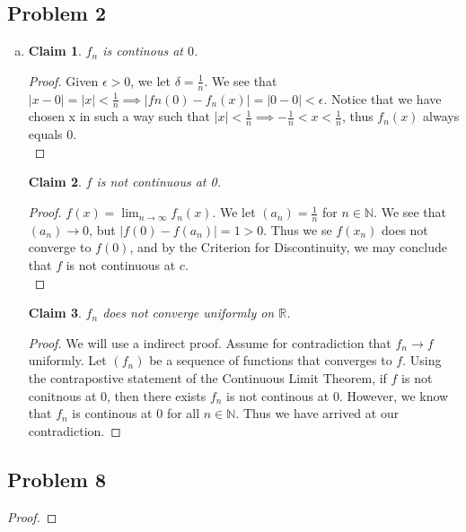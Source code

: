 \documentclass[12pt]{article}
\newtheorem*{claim}{Claim}
\begin{document}
\subsection*{Problem 2}
\begin{enumerate}[a).]
    \item {
        \begin{claim}
            $f_n$ is continous at $0$. 
        \end{claim}
        \begin{proof}
            Given $\epsilon > 0$, we let $\delta = \frac{1}{n}$. We see that $|x-0| = |x| < \frac{1}{n} \implies |fn(0) - f_n(x)| = |0 - 0| < \epsilon$. 
            Notice that we have chosen x in such a way such that $|x| < \frac{1}{n} \implies -\frac{1}{n} < x < \frac{1}{n}$, thus $f_n(x)$ always equals 0. \\
        \end{proof} 

        \begin{claim}
            $f$ is not continuous at 0.
        \end{claim}
        \begin{proof}
            $f(x) = \lim_{n \rightarrow \infty}f_n(x)$. We let $(a_n) = \frac{1}{n}$ for $n \in \mathbb{N}$. 
            We see that $(a_n) \rightarrow 0$, but $|f(0) - f(a_n)| = 1 > 0$.
            Thus we se $f(x_n)$ does not converge to $f(0)$, and by the Criterion for Discontinuity, we may conclude that $f$ is not continuous at $c$. \\
        \end{proof}

        \begin{claim}
            $f_n$ does not converge uniformly on $\mathbb{R}$. 
        \end{claim}
        \begin{proof}
            We will use a indirect proof. 
            Assume for contradiction that $f_n \rightarrow f$ uniformly. 
            Let $(f_n)$ be a sequence of functions that converges to $f$. 
            Using the contrapostive statement of the Continuous Limit Theorem, if $f$ is not conitnous at $0$, then there exists $f_n$ is not continous at $0$. 
            However, we know that $f_n$ is continous at $0$ for all $n \in \mathbb{N}$. 
            Thus we have arrived at our contradiction.
        \end{proof}
    }
\end{enumerate}


\subsection*{Problem 8}
\begin{proof}
    
    
\end{proof}
\end{document}

